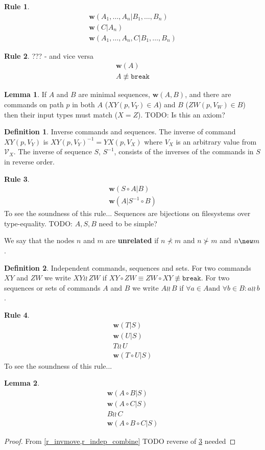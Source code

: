 \documentclass[12pt]{article}
\newcommand{\setvx}[1]{\mathcal{V}_{#1}}
\newcommand{\cbrk}{\mathtt{break}}
\newcommand{\fscommand}[2]{{#1#2}}
\newcommand{\cxy}{\fscommand{X}{Y}}
\newcommand{\cyx}{\fscommand{Y}{X}}
\newcommand{\czw}{\fscommand{Z}{W}}
\newcommand{\cc}{\circ} %
\newcommand{\descendant}{\prec}
\newcommand{\ancestor}{\succ}
\newcommand{\nequiv}{\not\equiv}
\newcommand{\indep}{\wr\!\!\wr\,} %
\newcommand{\works}[1]{{\mathbf{w}}({#1})}
\newcommand{\worksc}[2]{{\mathbf{w}}({#1}|{#2})}
\newcommand{\infer}[2]{\begin{array}{c}{#1}\\\hline{#2}\end{array}}
\newcommand{\inferr}[3]{\begin{array}{c}{#1}\\{#2}\\\hline{#3}\end{array}}
\newcommand{\inferrr}[4]{\begin{array}{c}{#1}\\{#2}\\{#3}\\\hline{#4}\end{array}}
\theoremstyle{definition}
\newtheorem{mydef}{Definition}
\newtheorem{mylem}{Lemma}
\newtheorem{myrul}{Rule}
\begin{document}
\begin{myrul}\label{r_w_w}
\[\inferr{\worksc{A_1,\ldots,A_n}{B_1,\ldots,B_n}}{\worksc{C}{A_n}}{\worksc{A_1,\ldots,A_n,C}{B_1,\ldots,B_n}}\]
\end{myrul}

\begin{myrul}{??? - and vice versa}
\[\infer{\works{A}}{A\nequiv\cbrk}\]
\end{myrul}

\begin{mylem}\label{worksinputmatch}
If $A$ and $B$ are minimal sequences, $\works{A,B}$,
and there are commands on path $p$ in both $A$ ($\cxy(p, V_Y)\in A$) and $B$ ($\czw(p, V_W)\in B$)
then their input types must match ($X=Z$).
TODO: Is this an axiom?
\end{mylem}

\begin{mydef}{Inverse commands and sequences.}
The inverse of command $\cxy(p,V_Y)$ is $\cxy(p,V_Y)^{-1} = \cyx(p,V_X)$
where $V_X$ is an arbitrary value from $\setvx{X}$.
The inverse of sequence $S$, $S^{-1}$, consists of the inverses of the commands in $S$
in reverse order.
\end{mydef}

\begin{myrul}\label{r_invmove}
\[ \infer{\worksc{S\cc A}{B}}{\worksc{A}{S^{-1}\cc B}} \]
To see the soundness of this rule...
Sequences are bijections on filesystems over type-equality.
TODO: $A,S,B$ need to be simple?
\end{myrul}


We say that the nodes $n$ and $m$ are \textbf{unrelated} if $n\not\descendant m$ and $n\not\ancestor m$
and $n\new m$.


\begin{mydef}{Independent commands, sequences and sets.}
For two commands $\cxy$ and $\czw$ we write $\cxy\indep\czw$ if $\cxy\cc \czw\equiv\czw\cc \cxy\nequiv\cbrk$.
For two sequences or sets of commands $A$ and $B$ we write $A\indep B$ if
$\forall a\in A \mbox{and~} \forall b\in B: a\indep b$.
\end{mydef}

\begin{myrul}\label{r_indep_combine}
\[ \inferrr{\worksc{T}{S}}{\worksc{U}{S}}{T\indep U}{\worksc{T\cc U}{S}} \]
To see the soundness of this rule...
\end{myrul}

\begin{mylem}\label{indep_prefix_combine}
\[ \inferrr{\worksc{A\cc B}{S}}{\worksc{A\cc C}{S}}{B\indep C}{\worksc{A\cc B\cc C}{S}} \]
\end{mylem}
\begin{proof}
From \cref{r_invmove,r_indep_combine}
TODO reverse of \cref{r_invmove} needed
\end{proof}
\end{document}
